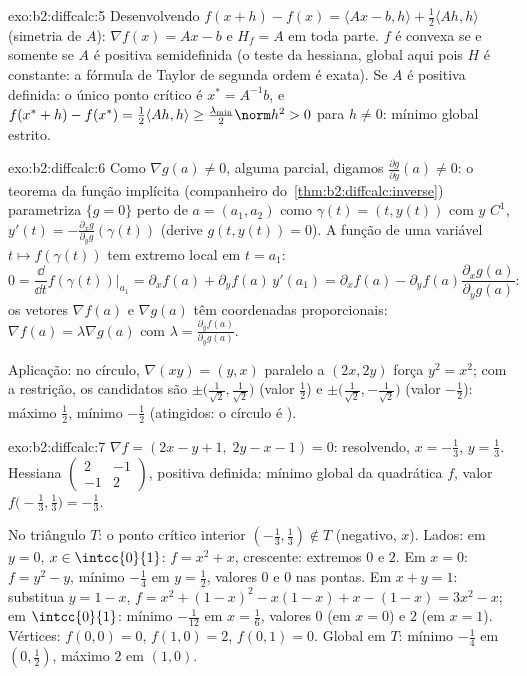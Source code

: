 \begin{solution}{exo:b2:diffcalc:5}
Desenvolvendo $f(x + h) - f(x) = \langle Ax - b, h\rangle +
\frac12\langle Ah, h\rangle$ (simetria de $A$): $\nabla f(x) = Ax -
b$ e $H_f = A$ em toda parte. $f$ é convexa se e somente se $A$ é positiva
semidefinida (o teste da hessiana, global aqui pois $H$ é constante:
a fórmula de Taylor de segunda ordem é exata). Se $A$ é positiva
definida: o único ponto crítico é $x^* = A^{-1}b$, e $f(x^*
+ h) - f(x^*) = \frac12\langle Ah, h\rangle \geq
\frac{\lambda_{\min}}{2}\norm h^2 > 0$ para $h \neq 0$: mínimo
global estrito.
\end{solution}

\begin{solution}{exo:b2:diffcalc:6}
Como $\nabla g(a) \neq 0$, alguma parcial, digamos $\frac{\partial
g}{\partial y}(a) \neq 0$: o teorema da função implícita
(companheiro do~\cref{thm:b2:diffcalc:inverse}) parametriza $\{g =
0\}$ perto de $a = (a_1, a_2)$ como $\gamma(t) = (t, y(t))$ com $y$
$C^1$, $y'(t) = -\frac{\partial_x g}{\partial_y g}(\gamma(t))$
(derive $g(t, y(t)) = 0$). A função de uma variável $t
\mapsto f(\gamma(t))$ tem extremo local em $t = a_1$:
\[
0 = \frac{\dd}{\dd t}f(\gamma(t))\Big|_{a_1}
= \partial_x f(a) + \partial_y f(a)\,y'(a_1)
= \partial_x f(a) - \partial_yf(a)\frac{\partial_x
g(a)}{\partial_y g(a)} :
\]
os vetores $\nabla f(a)$ e $\nabla g(a)$ têm coordenadas
proporcionais: $\nabla f(a) = \lambda \nabla g(a)$ com $\lambda =
\frac{\partial_y f(a)}{\partial_y g(a)}$.

Aplicação: no círculo, $\nabla(xy) = (y, x)$ paralelo a
$(2x, 2y)$ força $y^2 = x^2$; com a restrição, os candidatos
são $\pm\bigl(\tfrac{1}{\sqrt2}, \tfrac{1}{\sqrt2}\bigr)$ (valor
$\frac12$) e $\pm\bigl(\tfrac{1}{\sqrt2},
-\tfrac{1}{\sqrt2}\bigr)$ (valor $-\frac12$): máximo $\frac12$, mínimo
$-\frac12$ (atingidos: o círculo é ).
\end{solution}

\begin{solution}{exo:b2:diffcalc:7}
$\nabla f = (2x - y + 1,\; 2y - x - 1) = 0$: resolvendo, $x =
-\frac13$, $y = \frac13$. Hessiana $\begin{pmatrix} 2 & -1\\ -1 &
2\end{pmatrix}$, positiva definida: mínimo global da quadrática
$f$, valor $f\bigl(-\frac13, \frac13\bigr) = -\frac13$.

No triângulo $T$: o ponto crítico interior $(-\frac13,
\frac13) \notin T$ (negativo, $x$). Lados: em $y = 0$, $x \in
\intcc{0}{1}$: $f = x^2 + x$, crescente: extremos $0$ e $2$. Em
$x = 0$: $f = y^2 - y$, mínimo $-\frac14$ em $y = \frac12$, valores
$0$ e $0$ nas pontas. Em $x + y = 1$: substitua $y = 1 - x$,
$f = x^2 + (1-x)^2 - x(1-x) + x - (1-x) = 3x^2 - x$; em
$\intcc{0}{1}$: mínimo $-\frac{1}{12}$ em $x = \frac16$, valores
$0$ (em $x=0$) e $2$ (em $x=1$). Vértices: $f(0,0) = 0$, $f(1,0)
= 2$, $f(0,1) = 0$. Global em $T$: mínimo $-\frac14$ em $(0,
\frac12)$, máximo $2$ em $(1, 0)$.
\end{solution}

